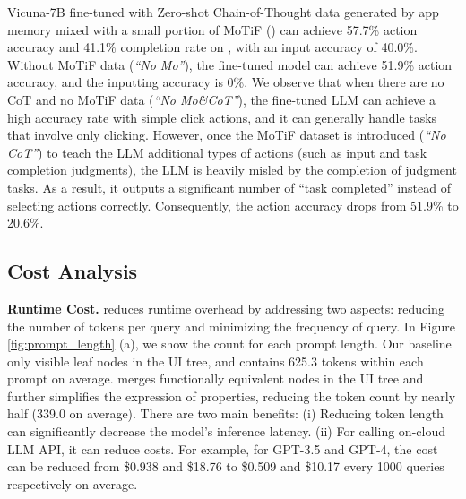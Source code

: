 Vicuna-7B \cite{vicuna2023} fine-tuned with Zero-shot Chain-of-Thought data generated by app memory mixed with a small portion of MoTiF \cite{motif} (\textit{\name}) can achieve 57.7\% action accuracy and 41.1\% completion rate on \datasetname, with an input accuracy of 40.0\%.
Without MoTiF \cite{motif} data (\textit{``No Mo''}), the fine-tuned model can achieve 51.9\% action accuracy, and the inputting accuracy is 0\%. %
We observe that when there are no CoT and no MoTiF data (\textit{``No Mo\&CoT''}), the fine-tuned LLM can achieve a high accuracy rate with simple click actions, and it can generally handle tasks that involve only clicking. However, once the MoTiF dataset is introduced (\textit{``No CoT''}) to teach the LLM additional types of actions (such as input and task completion judgments), the LLM is heavily misled by the completion of judgment tasks. As a result, it outputs a significant number of ``task completed'' instead of selecting actions correctly. Consequently, the action accuracy drops from 51.9\% to 20.6\%.
\vspace{-0.3cm}
\subsection{Cost Analysis}
\label{eval:overhead}

\textbf{Runtime Cost.}
\name reduces runtime overhead by addressing two aspects: reducing the number of tokens per query and minimizing the frequency of query. In Figure \ref{fig:prompt_length} (a), we show the count for each prompt length. Our baseline \cite{talking_with_ui}  only visible leaf nodes in the UI tree, and contains 625.3 tokens within each prompt on average. \name merges functionally equivalent nodes in the UI tree and further simplifies the expression of properties, reducing the token count by nearly half (339.0 on average). %
There are two main benefits: (i) Reducing token length can significantly decrease the model's inference latency. (ii) For calling on-cloud LLM API, it can reduce costs. For example, for GPT-3.5 and GPT-4, the cost can be reduced from \$0.938 and \$18.76 to \$0.509 and \$10.17 every 1000 queries respectively on average.

